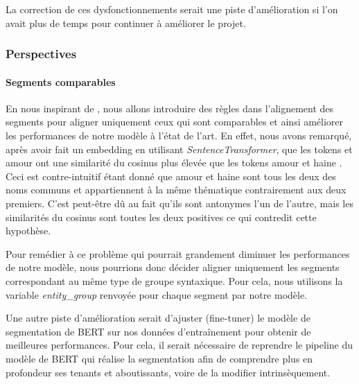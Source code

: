 \documentclass[a4paper, twoside, 11pt]{article}
\begin{document}
La correction de ces dysfonctionnements serait une piste d'amélioration si l'on avait plus de temps pour continuer à améliorer le projet.

 \subsubsection{Perspectives}
 \paragraph{Segments comparables}
       \hfill \break
En nous inspirant de \cite{banjade}, nous allons introduire des règles dans l’alignement des segments pour aligner uniquement ceux qui sont \og comparables \fg{} et ainsi améliorer les performances de notre modèle à l'état de l'art. En effet, nous avons remarqué, après avoir fait un \og embedding \fg{} en utilisant \textit{SentenceTransformer}, que les tokens  \fg{} et \og amour \fg{} ont une similarité du cosinus plus élevée que les tokens \og amour \fg{} et  \og haine \fg{}. Ceci est contre-intuitif étant donné que \og amour \fg{} et \og haine \fg{} sont tous les deux des noms communs et appartiennent à la même thématique contrairement aux deux premiers. C'est peut-être dû au fait qu'ils sont antonymes l’un de l’autre, mais les similarités du cosinus sont toutes les deux positives ce qui contredit cette hypothèse.

Pour remédier à ce problème qui pourrait grandement diminuer les performances de notre modèle, nous pourrions donc décider aligner uniquement les segments correspondant au même type de groupe syntaxique. Pour cela, nous utilisons la variable \textit{entity\_group} renvoyée pour chaque segment par notre modèle.

 Une autre piste d'amélioration serait d'ajuster (fine-tuner) le modèle de segmentation de BERT sur nos données d'entraînement pour obtenir de meilleures performances. Pour cela, il serait nécessaire de reprendre le pipeline du modèle de BERT qui réalise la segmentation afin de comprendre plus en profondeur ses tenants et aboutissants, voire de la modifier intrinsèquement.
    \printbibliography
\end{document}
